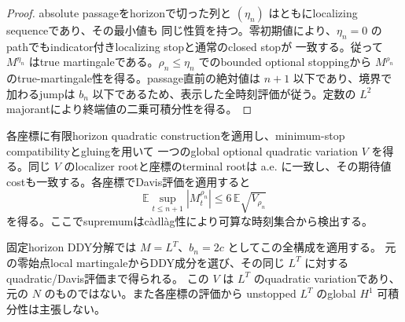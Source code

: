 \begin{proof}
absolute passageをhorizonで切った列と $(\eta_n)$ はともにlocalizing sequenceであり、その最小値も
同じ性質を持つ。零初期値により、$\eta_n=0$ のpathでもindicator付きlocalizing stopと通常のclosed stopが
一致する。従って $M^{\eta_n}$ はtrue martingaleである。$\rho_n\leq\eta_n$ でのbounded optional stoppingから
$M^{\rho_n}$ のtrue-martingale性を得る。passage直前の絶対値は $n+1$ 以下であり、境界で加わるjumpは
$b_n$ 以下であるため、表示した全時刻評価が従う。定数の $L^2$ majorantにより終端値の二乗可積分性を得る。
\end{proof}

各座標に有限horizon quadratic constructionを適用し、minimum-stop compatibilityとgluingを用いて
一つのglobal optional quadratic variation $V$ を得る。同じ $V$ のlocalizer rootと座標のterminal rootは
a.e. に一致し、その期待値costも一致する。各座標でDavis評価を適用すると
\[
 \mathbb E\sup_{t\leq n+1}|M^{\rho_n}_t|
 \leq 6\,\mathbb E\sqrt{V_{\rho_n}}
\]
を得る。ここでsupremumはc\`adl\`ag性により可算な時刻集合から検出する。

固定horizon DDY分解では $M=L^T$、$b_n=2c$ としてこの全構成を適用する。
元の零始点local martingaleからDDY成分を選び、その同じ $L^T$ に対するquadratic/Davis評価まで得られる。
この $V$ は $L^T$ のquadratic variationであり、元の $N$ のものではない。また各座標の評価から
unstopped $L^T$ のglobal $H^1$ 可積分性は主張しない。
